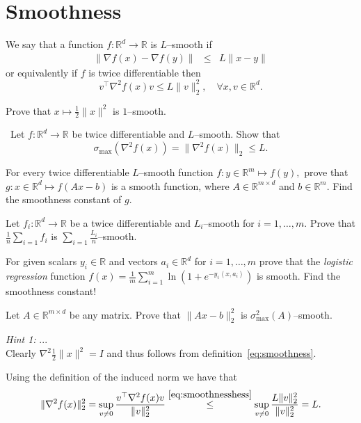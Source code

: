 \documentclass[11pt]{article}
\newcommand{\R}{\mathbb{R}}
\newcommand{\norm}[1]{\lVert#1\rVert}
\newcommand{\dotprod}[1]{\left< #1\right>}
\begin{document}
\section{Smoothness}
We say that a function $f: \R^d \rightarrow \R$ is $L$--smooth if 
\begin{eqnarray}\label{eq:smoothness}
\norm{\nabla f(x)- \nabla f(y)} &\leq & L \norm{x-y}
 \end{eqnarray}
or equivalently if $f$ is twice differentiable then
\begin{equation}\label{eq:smoothnesshess}
v^\top \nabla^2 f(x) v \leq L\norm{v}_2^2, \quad\forall x,v \in \R^d.
\end{equation}
\vspace{0.5cm}  
   
\begin{ExerciseList}
 \Exercise 
\ExePart \label{I} Prove that $x \mapsto \tfrac{1}{2}\norm{x}^2$ is $1$--smooth.
     
\ExePart~\label{VI}Let $f: \R^d \rightarrow \R$ be twice differentiable and $L$--smooth. Show that 
\[\sigma_{\max}(\nabla^2 f(x) ) = \norm{\nabla^2 f(x)}_2 \leq L.\]
    
 \ExePart \label{II} For every twice differentiable $L$--smooth function $f: y\in \R^m \mapsto f(y),$ prove that $g: x\in \R^d \mapsto f(Ax-b) $ is a smooth function, where $A \in \R^{m\times d}$ and $b \in \R^m.$ Find the smoothness constant of $g$.
   
\ExePart \label{III} Let $f_i:\R^d \rightarrow \R$ be a twice differentiable and $L_i$--smooth for $i =1,\ldots, m.$ Prove that $\tfrac{1}{n}\sum_{i=1}f_i$ is $\sum_{i=1}\tfrac{L_i}{n}$--smooth.

\ExePart \label{IV} For  given scalars $y_i \in \R$ and vectors $a_i \in \R^d$ for $i=1,\ldots, m$ prove that the \emph{logistic regression} function $f(x) = \tfrac{1}{m}\sum_{i=1}^m \ln(1+e^{-y_i\dotprod{x,a_i}})$ is smooth. Find the smoothness constant!
 
\ExePart \label{V} Let $A \in \R^{m \times d}$ be any matrix. Prove that $\norm{Ax -b}_2^2$ is  $\sigma_{\max}^2(A)$--smooth.
     
  \ExeText \emph{Hint 1:} ...\\
   \Answer[ref={I}]
   Clearly $\nabla^2 \tfrac{1}{2}\norm{x}^2 = I$ and thus follows from definition~\eqref{eq:smoothness}.
        
   \Answer[ref={VI}] Using the definition of the induced norm we have that
   \[ \norm{\nabla^2 f(x)}_2^2 = \sup_{v \neq 0} \frac{v^\top \nabla^2 f(x) v}{\norm{v}_2^2}
   \overset{\eqref{eq:smoothnesshess}}{ \leq} 
   \sup_{v \neq 0} \frac{L\norm{v}_2^2}{\norm{v}_2^2} =L. \]
        

\end{ExerciseList}
\end{document}
